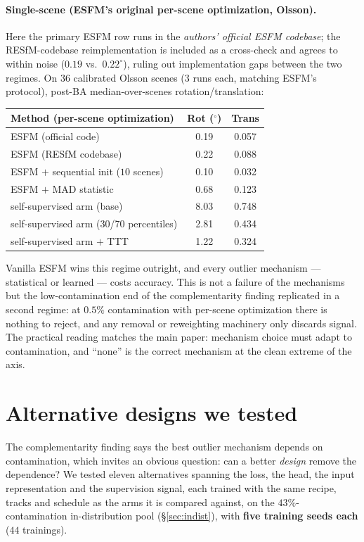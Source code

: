 \documentclass{article}
\renewcommand{\deg}{^{\circ}}
\begin{document}
\paragraph{Single-scene (ESFM's original per-scene optimization, Olsson).} Here the
primary ESFM row runs in the \emph{authors' official ESFM codebase}; the RESfM-codebase
reimplementation is included as a cross-check and agrees to within noise ($0.19$ vs.\
$0.22\deg$), ruling out implementation gaps between the two regimes. On $36$ calibrated
Olsson scenes ($3$ runs each, matching ESFM's protocol), post-BA median-over-scenes
rotation/translation:
\begin{center}\footnotesize
\begin{tabular}{lcc}
\toprule
Method (per-scene optimization) & Rot ($\deg$) & Trans\\
\midrule
ESFM (official code)            & 0.19 & 0.057\\
ESFM (RESfM codebase)           & 0.22 & 0.088\\
ESFM $+$ sequential init ($10$ scenes) & 0.10 & 0.032\\
ESFM $+$ MAD statistic          & 0.68 & 0.123\\
self-supervised arm (base)      & 8.03 & 0.748\\
self-supervised arm (30/70 percentiles) & 2.81 & 0.434\\
self-supervised arm $+$ TTT     & 1.22 & 0.324\\
\bottomrule
\end{tabular}
\end{center}
Vanilla ESFM wins this regime outright, and every outlier mechanism --- statistical or
learned --- costs accuracy. This is not a failure of the mechanisms but the
low-contamination end of the complementarity finding replicated in a second regime: at
$0.5\%$ contamination with per-scene optimization there is nothing to reject, and any
removal or reweighting machinery only discards signal. The practical reading matches
the main paper: mechanism choice must adapt to contamination, and ``none'' is the
correct mechanism at the clean extreme of the axis.


\section{Alternative designs we tested}\label{app:altdesigns}
The complementarity finding says the best outlier mechanism depends on contamination,
which invites an obvious question: can a better \emph{design} remove the dependence?
We tested eleven alternatives spanning the loss, the head, the input representation and
the supervision signal, each trained with the same recipe, tracks and schedule as the
arms it is compared against, on the $43\%$-contamination in-distribution pool
(\S\ref{sec:indist}), with \textbf{five training seeds each} ($44$ trainings).
\end{document}
